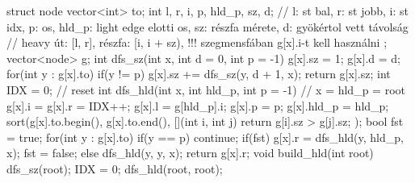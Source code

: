 struct node{
    vector<int> to;
    int l, r, i, p, hld_p, sz, d; // l: st bal, r: st jobb, i: st idx, p: os, hld_p: light edge elotti os, sz: részfa mérete, d: gyökértol vett távolság
    // heavy út: [l, r], részfa: [i, i + sz), !!! szegmensfában g[x].i-t kell használni
};
vector<node> g;
int dfs_sz(int x, int d = 0, int p = -1){
    g[x].sz = 1;
    g[x].d = d;
    for(int y : g[x].to) if(y != p) g[x].sz += dfs_sz(y, d + 1, x);
    return g[x].sz;
}
int IDX = 0; // reset
int dfs_hld(int x, int hld_p, int p = -1){ // x = hld_p = root
    g[x].i = g[x].r = IDX++;
    g[x].l = g[hld_p].i;
    g[x].p = p;
    g[x].hld_p = hld_p;
    sort(g[x].to.begin(), g[x].to.end(), [](int i, int j){ return g[i].sz > g[j].sz; });
    bool fst = true;
    for(int y : g[x].to){
        if(y == p) continue;
        if(fst) { g[x].r = dfs_hld(y, hld_p, x); fst = false; }
        else dfs_hld(y, y, x);
    }
    return g[x].r;
}
void build_hld(int root) { dfs_sz(root); IDX = 0; dfs_hld(root, root); }